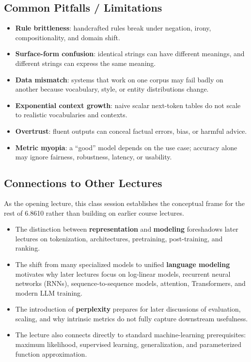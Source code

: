 \documentclass[11pt]{article}
\begin{document}
\subsection{Common Pitfalls / Limitations}
\begin{itemize}
    \item \textbf{Rule brittleness}: handcrafted rules break under negation, irony, compositionality, and domain shift.
    \item \textbf{Surface-form confusion}: identical strings can have different meanings, and different strings can express the same meaning.
    \item \textbf{Data mismatch}: systems that work on one corpus may fail badly on another because vocabulary, style, or entity distributions change.
    \item \textbf{Exponential context growth}: naive scalar next-token tables do not scale to realistic vocabularies and contexts.
    \item \textbf{Overtrust}: fluent outputs can conceal factual errors, bias, or harmful advice.
    \item \textbf{Metric myopia}: a ``good'' model depends on the use case; accuracy alone may ignore fairness, robustness, latency, or usability.
\end{itemize}

\subsection{Connections to Other Lectures}
As the opening lecture, this class session establishes the conceptual frame for the rest of 6.8610 rather than building on earlier course lectures.

\begin{itemize}
    \item The distinction between \textbf{representation} and \textbf{modeling} foreshadows later lectures on tokenization, architectures, pretraining, post-training, and ranking.
    \item The shift from many specialized models to unified \textbf{language modeling} motivates why later lectures focus on log-linear models, recurrent neural networks (RNNs), sequence-to-sequence models, attention, Transformers, and modern LLM training.
    \item The introduction of \textbf{perplexity} prepares for later discussions of evaluation, scaling, and why intrinsic metrics do not fully capture downstream usefulness.
    \item The lecture also connects directly to standard machine-learning prerequisites: maximum likelihood, supervised learning, generalization, and parameterized function approximation.
\end{itemize}
\end{document}
